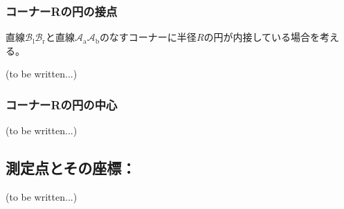 \subsubsection{コーナーRの円の接点\TBW}
直線$\mathcal B_\mathrm l\mathcal B_\mathrm r$と直線$\mathcal A_\mathrm a\mathcal A_\mathrm b$のなすコーナーに半径$R$の円が内接している場合を考える。

(to be written...)

\subsubsection{コーナーRの円の中心\TBW}
(to be written...)


\subsection{測定点とその座標：\EndFaceInChamfer\TBW}
(to be written...)
